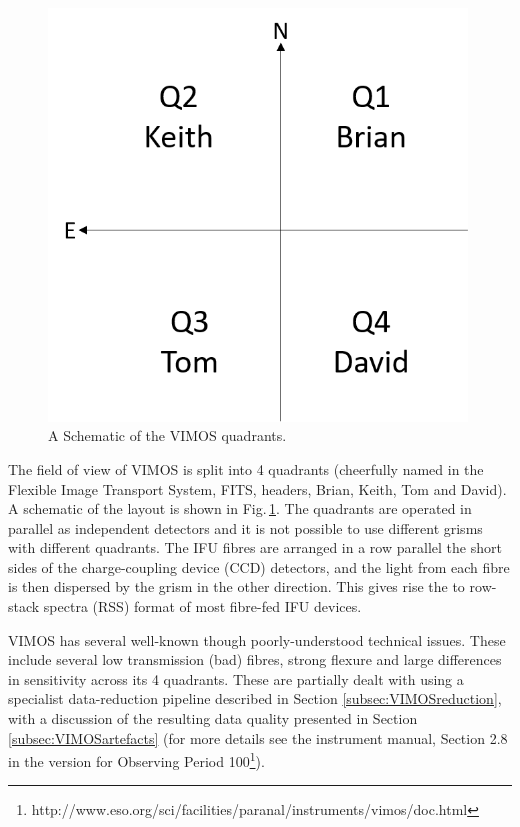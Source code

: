 		\begin{figure}
			\centering
			\includegraphics[width=0.99\textwidth]{chapter2/quadrants.png}
			\caption[Schematic of the VIMOS quadrants]{A Schematic of the VIMOS quadrants.}
			\label{fig:quadrants}
		\end{figure}

		The field of view of VIMOS is split into 4 quadrants (cheerfully named in the Flexible Image Transport System, FITS, headers, Brian, Keith, Tom and David). A schematic of the layout is shown in Fig.\,\ref{fig:quadrants}. The quadrants are operated in parallel as independent detectors and it is not possible to use different grisms with different quadrants. The IFU fibres are arranged in a row parallel the short sides of the charge-coupling device (CCD) detectors, and the light from each fibre is then dispersed by the grism in the other direction. This gives rise the to row-stack spectra (RSS) format of most fibre-fed IFU devices.

		VIMOS has several well-known though poorly-understood technical issues. These include several low transmission (bad) fibres, strong flexure and large differences in sensitivity across its 4 quadrants. These are partially dealt with using a specialist data-reduction pipeline described in Section \ref{subsec:VIMOSreduction}, with a discussion of the resulting data quality presented in Section \ref{subsec:VIMOSartefacts} (for more details see the instrument manual, Section 2.8 in the version for Observing Period 100\footnote{http://www.eso.org/sci/facilities/paranal/instruments/vimos/doc.html}).

